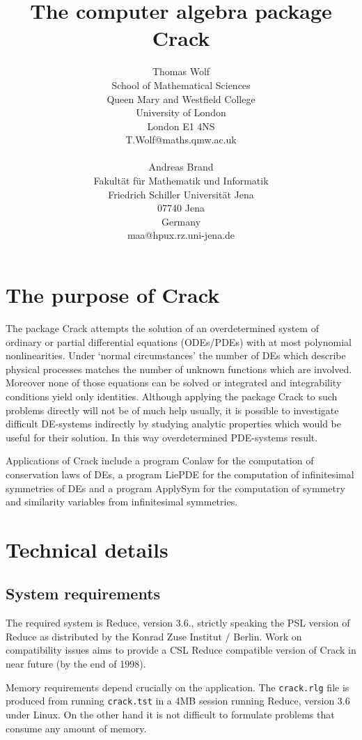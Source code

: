 \documentclass[12pt]{article}
\title{The computer algebra package {\sc Crack}}
\author{Thomas Wolf \\                        
	School of Mathematical Sciences \\
	Queen Mary and Westfield College \\
	University of London \\
	London E1 4NS \\
	T.Wolf@maths.qmw.ac.uk
\\ \\
Andreas Brand \\Fakult\"{a}t f\"{u}r Mathematik und 
Informatik \\Friedrich Schiller Universit\"{a}t Jena \\ 07740 Jena
\\ Germany \\ maa@hpux.rz.uni-jena.de
}
\begin{document}
\maketitle
\tableofcontents                                  
\section{The purpose of {\sc Crack}}
The package {\sc Crack} attempts the solution of an overdetermined 
system of ordinary or partial differential
equations (ODEs/PDEs) with at most polynomial nonlinearities. 
Under `normal circumstances' the number of DEs which describe physical
processes matches the number of unknown functions which are involved.
Moreover none of those equations can be solved or integrated and
integrability conditions yield only identities. Although applying
the package
{\sc Crack} to such problems
directly will not be of much help usually, it is possible to
investigate difficult DE-systems indirectly by 
studying analytic properties which would be useful for their
solution. In this way overdetermined PDE-systems result.

Applications of {\sc Crack} include a program {\sc Conlaw}
for the computation of conservation laws of DEs, a program 
{\sc LiePDE} for the computation of infinitesimal symmetries of DEs
and a program {\sc ApplySym} for the computation of symmetry and 
similarity variables from infinitesimal symmetries.

\section{Technical details}  
\subsection{System requirements} 
The required system is {\sc Reduce}, version
3.6., strictly speaking the PSL version of {\sc Reduce} as distributed by
the Konrad Zuse Institut / Berlin. Work on compatibility issues
aims to provide a CSL {\sc Reduce} compatible version of {\sc Crack}
in near future (by the end of 1998).

Memory requirements depend crucially on the
application. 
The {\tt crack.rlg} file is produced from running 
{\tt crack.tst} in a 4MB session running {\sc Reduce}, version 3.6 under
{\sc Linux}. On the other hand 
it is not difficult to formulate problems that 
consume any amount of memory.
\end{document}
